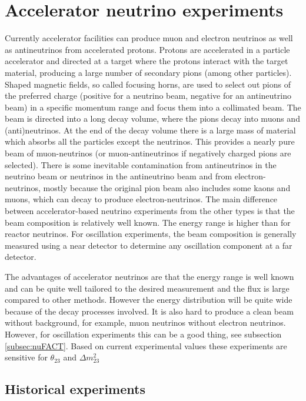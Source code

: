 \pagebreak
\newpage
\section{Accelerator neutrino experiments}
Currently accelerator facilities can produce muon and electron neutrinos as well as antineutrinos from accelerated protons. Protons are accelerated in a particle accelerator and directed at a target where the protons interact with the target material, producing a large number of secondary pions (among other particles). Shaped magnetic fields, so called focusing horns, are used to select out pions of the preferred charge (positive for a neutrino beam, negative for an antineutrino beam) in a specific momentum range and focus them into a collimated beam. The beam is directed into a long decay volume, where the pions decay into muons and (anti)neutrinos. At the end of the decay volume there is a large mass of material which absorbs all the particles except the neutrinos. This provides a nearly pure beam of muon-neutrinos (or muon-antineutrinos if negatively charged pions are selected). There is some inevitable contamination from antineutrinos in the neutrino beam or neutrinos in the antineutrino beam and from electron-neutrinos, mostly because the original pion beam also includes some kaons and muons, which can decay to produce electron-neutrinos. The main difference between accelerator-based neutrino experiments from the other types is that the beam composition is relatively well known. The energy range is higher than for reactor neutrinos. For oscillation experiments, the beam composition is generally measured using a near detector to determine any oscillation component at a far detector.

The advantages of accelerator neutrinos are that the energy range is well known and can be quite well tailored to the desired measurement and the flux is large compared to other methods. However the energy distribution will be quite wide because of the decay processes involved. It is also hard to produce a clean beam without background, for example, muon neutrinos without electron neutrinos. However, for oscillation experiments this can be a good thing, see subsection \ref{subsec:nuFACT}. Based on current experimental values these experiments are sensitive for $\theta_{23}$ and $\Delta m_{23}^2 $

\subsection{Historical experiments}

